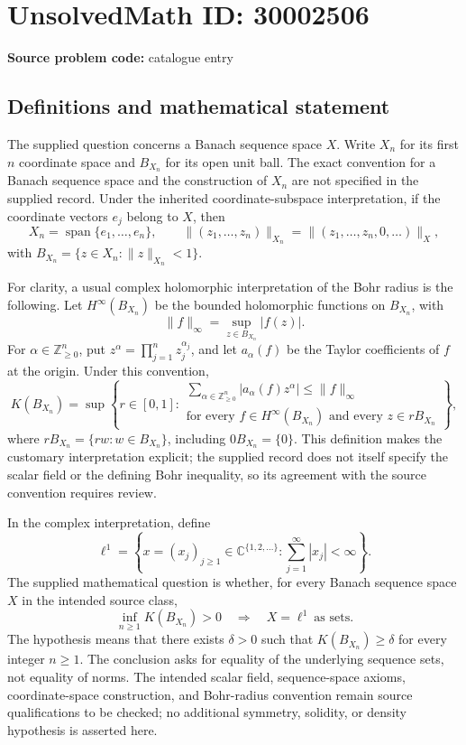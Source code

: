 \documentclass[11pt]{article}
\newcommand{\C}{\mathbb{C}}
\begin{document}
\section*{UnsolvedMath ID: 30002506}
\textbf{Source problem code:} catalogue entry
\subsection{Definitions and mathematical statement}
The supplied question concerns a Banach sequence space \(X\). Write \(X_n\) for its first \(n\) coordinate space and \(B_{X_n}\) for its open unit ball. The exact convention for a Banach sequence space and the construction of \(X_n\) are not specified in the supplied record. Under the inherited coordinate-subspace interpretation, if the coordinate vectors \(e_j\) belong to \(X\), then
\[
X_n=\operatorname{span}\{e_1,\ldots,e_n\},\qquad
\|(z_1,\ldots,z_n)\|_{X_n}
=\|(z_1,\ldots,z_n,0,\ldots)\|_X,
\]
with \(B_{X_n}=\{z\in X_n:\|z\|_{X_n}<1\}\).

For clarity, a usual complex holomorphic interpretation of the Bohr radius is the following. Let \(H^\infty(B_{X_n})\) be the bounded holomorphic functions on \(B_{X_n}\), with
\[
\|f\|_\infty=\sup_{z\in B_{X_n}}|f(z)|.
\]
For \(\alpha\in\mathbb Z_{\geq0}^n\), put \(z^\alpha=\prod_{j=1}^n z_j^{\alpha_j}\), and let \(a_\alpha(f)\) be the Taylor coefficients of \(f\) at the origin. Under this convention,
\[
K(B_{X_n})=
\sup\left\{r\in[0,1]:
\begin{array}{l}
\displaystyle\sum_{\alpha\in\mathbb Z_{\geq0}^n}
|a_\alpha(f)z^\alpha|\leq\|f\|_\infty\\[2pt]
\text{for every }f\in H^\infty(B_{X_n})
\text{ and every }z\in rB_{X_n}
\end{array}\right\},
\]
where \(rB_{X_n}=\{rw:w\in B_{X_n}\}\), including \(0B_{X_n}=\{0\}\). This definition makes the customary interpretation explicit; the supplied record does not itself specify the scalar field or the defining Bohr inequality, so its agreement with the source convention requires review.

In the complex interpretation, define
\[
\ell^1=\left\{x=(x_j)_{j\geq1}\in\C^{\{1,2,\ldots\}}:
\sum_{j=1}^{\infty}|x_j|<\infty\right\}.
\]
The supplied mathematical question is whether, for every Banach sequence space \(X\) in the intended source class,
\[
\inf_{n\geq1}K(B_{X_n})>0
\quad\Longrightarrow\quad
X=\ell^1\ \text{as sets}.
\]
The hypothesis means that there exists \(\delta>0\) such that \(K(B_{X_n})\geq\delta\) for every integer \(n\geq1\). The conclusion asks for equality of the underlying sequence sets, not equality of norms. The intended scalar field, sequence-space axioms, coordinate-space construction, and Bohr-radius convention remain source qualifications to be checked; no additional symmetry, solidity, or density hypothesis is asserted here.
\end{document}
